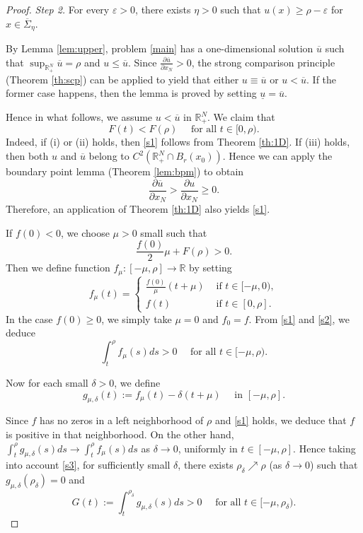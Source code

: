 \documentclass[reqno]{amsart}
\theoremstyle{plain}
\theoremstyle{definition}
\theoremstyle{remark}
\begin{document}
\begin{proof}
		\textit{Step 2.} For every $\varepsilon > 0$, there exists $\eta > 0$ such that $u(x) \ge \rho - \varepsilon$ for $x\in\overline\Sigma_\eta$.
		
		By Lemma \ref{lem:upper}, problem \eqref{main} has a one-dimensional solution $\overline u$ such that $\sup_{\mathbb{R}^N_+} \overline u = \rho$ and $u \le \overline u$. Since $\frac{\partial\overline u}{\partial x_N}>0$, the strong comparison principle (Theorem \ref{th:scp}) can be applied to yield that either $u \equiv \overline u$ or $u < \overline u$. If the former case happens, then the lemma is proved by setting $\underline u = \overline u$.
		
		Hence in what follows, we assume $u < \overline u$ in $\mathbb{R}^N_+$. We claim that
		\begin{equation}\label{s1}
			F(t) < F(\rho) \quad\text{ for all } t\in[0,\rho).
		\end{equation}	
		Indeed, if (i) or (ii) holds, then \eqref{s1} follows from Theorem \ref{th:1D}.
		If (iii) holds, then both $u$ and $\overline u$ belong to $C^2(\mathbb{R}^N_+\cap B_r(x_0))$. Hence we can apply the boundary point lemma (Theorem \ref{lem:bpm}) to obtain
		\[
		\frac{\partial \overline u}{\partial x_N}>\frac{\partial u}{\partial x_N}\ge0.
		\]
		Therefore, an application of Theorem \ref{th:1D} also yields \eqref{s1}.
		
		If $f (0) < 0$, we choose $\mu>0$ small such that
		\begin{equation}\label{s2}
			\frac{f(0)}{2}\mu + F(\rho) > 0.
		\end{equation}
		Then we define function $f_\mu:[-\mu,\rho]\to\mathbb{R}$ by setting
		\[
		f_\mu(t) =
		\begin{cases}
			\frac{f(0)}{\mu}(t+\mu) & \text{ if } t\in[-\mu,0),\\
			f(t) & \text{ if } t\in[0,\rho].
		\end{cases}
		\]
		In the case $f (0) \ge 0$, we simply take $\mu = 0$ and $f_0 = f$. From \eqref{s1} and \eqref{s2}, we deduce
		\begin{equation}\label{s3}
			\int_{t}^{\rho} f_\mu(s) ds > 0 \quad\text{ for all } t\in[-\mu,\rho).
		\end{equation}
		
		Now for each small $\delta>0$, we define
		\[
		g_{\mu,\delta}(t) := f_\mu(t) - \delta (t+\mu) \quad\text{ in } [-\mu,\rho].
		\]
		
		Since $f$ has no zeros in a left neighborhood of $\rho$ and \eqref{s1} holds, we deduce that $f$ is positive in that neighborhood. On the other hand, $\int_{t}^{\rho} g_{\mu,\delta}(s) ds \to \int_{t}^{\rho} f_\mu(s) ds$ as $\delta\to0$, uniformly in $t\in[-\mu,\rho]$. Hence taking into account \eqref{s3}, for sufficiently small $\delta$, there exists $\rho_\delta\nearrow\rho$ (as $\delta\to0$) such that $g_{\mu,\delta}(\rho_\delta)=0$ and
		\[
		G(t):=\int_{t}^{\rho_\delta} g_{\mu,\delta}(s) ds > 0 \quad\text{ for all } t \in [-\mu, \rho_\delta).
		\]
		

\end{proof}
\end{document}
